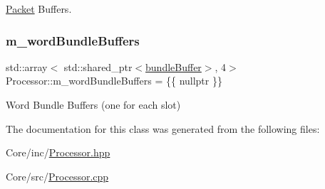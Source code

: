 \hyperlink{class_packet}{Packet} Buffers. 

\mbox{\label{class_processor_a8277cf1524daaa16f0dacfddd02ffd13}} 
\subsubsection{\texorpdfstring{m\+\_\+word\+Bundle\+Buffers}{m\_wordBundleBuffers}}
{\footnotesize\ttfamily std\+::array$<$ std\+::shared\+\_\+ptr$<$\hyperlink{class_processor_a531b4c5f7c0d810fc6e9e1dd3d115725}{bundle\+Buffer}$>$, 4$>$ Processor\+::m\+\_\+word\+Bundle\+Buffers = \{\{ nullptr \}\}\hspace{0.3cm}{\ttfamily [private]}}



Word Bundle Buffers (one for each slot) 



The documentation for this class was generated from the following files\+:\begin{DoxyCompactItemize}
\item 
Core/inc/\hyperlink{_processor_8hpp}{Processor.\+hpp}\item 
Core/src/\hyperlink{_processor_8cpp}{Processor.\+cpp}\end{DoxyCompactItemize}
